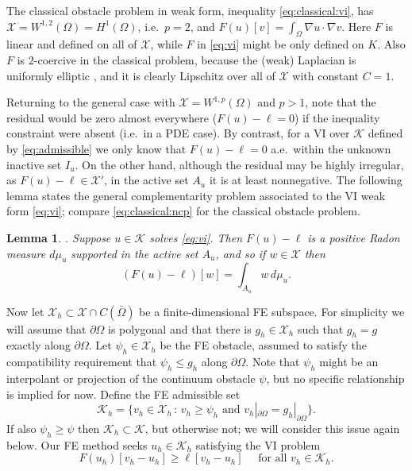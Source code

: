 \documentclass[]{interact}
\theoremstyle{plain}%
\newtheorem{lemma}[theorem]{Lemma}
\theoremstyle{definition}
\theoremstyle{remark}
\newcommand{\grad}{\nabla}
\newcommand{\cK}{\mathcal{K}}
\newcommand{\cX}{\mathcal{X}}
\begin{document}
The classical obstacle problem in weak form, inequality \eqref{eq:classical:vi}, has $\cX=W^{1,2}(\Omega) = H^1(\Omega)$, i.e.~$p=2$, and $F(u)[v] = \int_\Omega \grad u \cdot \grad v$.  Here $F$ is linear and defined on all of $\cX$, while $F$ in \eqref{eq:vi} might be only defined on $K$.  Also $F$ is $2$-coercive in the classical problem, because the (weak) Laplacian is uniformly elliptic \cite{Evans2010}, and it is clearly Lipschitz over all of $\cX$ with constant $C=1$.

Returning to the general case with $\cX = W^{1,p}(\Omega)$ and $p>1$, note that the residual would be zero almost everywhere ($F(u)-\ell=0$) if the inequality constraint were absent (i.e.~in a PDE case).  By contrast, for a VI over $\cK$ defined by \eqref{eq:admissible} we only know that $F(u)-\ell=0$ a.e.~within the unknown inactive set $I_u$.  On the other hand, although the residual may be highly irregular, as $F(u)-\ell\in \cX'$, in the active set $A_u$ it is at least nonnegative.  The following lemma states the general complementarity problem associated to the VI weak form \eqref{eq:vi}; compare \eqref{eq:classical:ncp} for the classical obstacle problem.

\begin{lemma} \cite[Theorem II.6.9]{KinderlehrerStampacchia1980}.  Suppose $u\in \cK$ solves \eqref{eq:vi}.  Then $F(u)-\ell$ is a positive Radon measure $d\mu_u$ supported in the active set $A_u$, and so if $w\in\cX$ then
\begin{equation}
(F(u)-\ell)[w] = \int_{A_u} w\, d\mu_u. \label{eq:measure}
\end{equation}
\end{lemma}

Now let $\cX_h \subset \cX \cap C(\bar\Omega)$ be a finite-dimensional FE subspace.  For simplicity we will assume that $\partial \Omega$ is polygonal and that there is $g_h\in\cX_h$ such that $g_h=g$ exactly along $\partial \Omega$.  Let $\psi_h \in \cX_h$ be the FE obstacle, assumed to satisfy the compatibility requirement that $\psi_h \le g_h$ along $\partial\Omega$.  Note that $\psi_h$ might be an interpolant or projection of the continuum obstacle $\psi$, but no specific relationship is implied for now.  Define the FE admissible set
\begin{equation} \label{eq:fe:admissible}
\cK_h = \{v_h \in \cX_h \,:\, v_h \ge \psi_h \text{ and } v_h|_{\partial \Omega} = g_h|_{\partial\Omega}\}.
\end{equation}
If also $\psi_h \ge \psi$ then $\cK_h\subset \cK$, but otherwise not; we will consider this issue again below.  Our FE method seeks $u_h\in\cK_h$ satisfying the VI problem
\begin{equation} \label{eq:fe:vi}
F(u_h)[v_h - u_h] \ge \ell[v_h - u_h] \quad \text{ for all } v_h \in \cK_h.
\end{equation}
\end{document}
